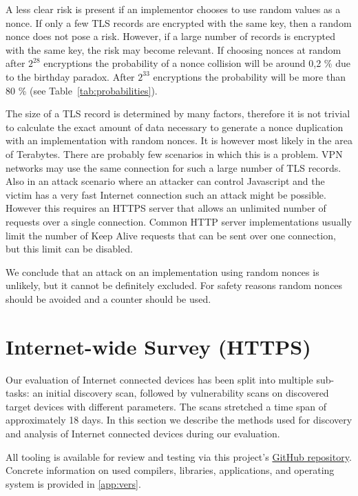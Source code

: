 A less clear risk is present if an implementor chooses to use random values as a nonce. If only
a few TLS records
are encrypted with the same key, then a random nonce does not pose a risk. However, if a large number
of records is encrypted with the same key, the risk may become relevant. If choosing nonces at random after
$2^{28}$ encryptions the probability of a nonce collision
will be around 0,2 \% due to the birthday paradox. After $2^{33}$ encryptions the probability will be more
than 80 \% (see Table~\ref{tab:probabilities}).

The size of a TLS record is determined by many factors, therefore it is not trivial to calculate the exact
amount of data necessary to generate a nonce duplication with an implementation with random nonces. It
is however most likely in the area of Terabytes. There are probably few scenarios in which this is a
problem. VPN networks may use the same connection for such a large number of TLS records. Also in
an attack scenario where an attacker can control Javascript and the victim has a very fast Internet
connection such an attack might be possible. However this requires an HTTPS server that allows an
unlimited number of requests over a single connection. Common HTTP server implementations usually
limit the number of Keep Alive requests that can be sent over one connection, but this limit can
be disabled.

We conclude that an attack on an implementation using random nonces is unlikely, but it cannot be
definitely excluded.
For safety reasons random nonces should be avoided and a counter should be used.

\section{Internet-wide Survey (HTTPS)}
Our evaluation of Internet connected devices has been split into multiple sub-tasks: an initial discovery scan, followed by vulnerability scans on discovered target devices
with different parameters. The scans stretched a time span of approximately 18 days. In this section we describe the methods used for discovery and analysis of Internet connected
devices during our evaluation.

All tooling is available for review and testing via this project's \href{https://github.com/nonce-disrespect/nonce-disrespect/}{GitHub repository}. Concrete information on used compilers, libraries, applications, and operating system is provided in \cref{app:vers}.

